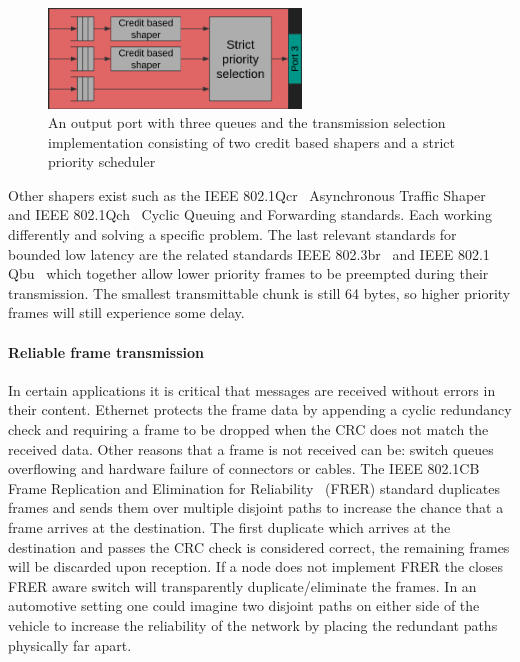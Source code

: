 \begin{figure}[htbp]
    \centering
    \includegraphics[width=0.6\textwidth]{images/cbs.png}
    \caption{An output port with three queues and the transmission selection implementation consisting of two credit based shapers and a strict priority scheduler}
    \label{fig:cbs}
\end{figure}

Other shapers exist such as the IEEE 802.1Qcr~\cite{IEEE8021Qcr} Asynchronous Traffic Shaper and IEEE 802.1Qch~\cite{IEEE8021Qch} Cyclic Queuing and Forwarding standards. Each working differently and solving a specific problem. The last relevant standards for bounded low latency are the related standards IEEE 802.3br~\cite{IEEE8023br} and IEEE 802.1 Qbu~\cite{IEEE8021Qbu} which together allow lower priority frames to be preempted during their transmission. The smallest transmittable chunk is still 64 bytes, so higher priority frames will still experience some delay. 

\paragraph{Reliable frame transmission} In certain applications it is critical that messages are received without errors in their content. Ethernet protects the frame data by appending a cyclic redundancy check and requiring a frame to be dropped when the CRC does not match the received data. Other reasons that a frame is not received can be: switch queues overflowing and hardware failure of connectors or cables. The IEEE 802.1CB Frame Replication and Elimination for Reliability~\cite{IEEE8021CB} (FRER) standard duplicates frames and sends them over multiple disjoint paths to increase the chance that a frame arrives at the destination. The first duplicate which arrives at the destination and passes the CRC check is considered correct, the remaining frames will be discarded upon reception. If a node does not implement FRER the closes FRER aware switch will transparently duplicate/eliminate the frames. In an automotive setting one could imagine two disjoint paths on either side of the vehicle to increase the reliability of the network by placing the redundant paths physically far apart.

